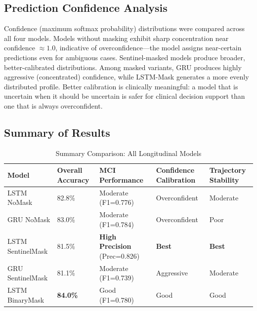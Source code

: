 \documentclass[12pt,singleside,a4paper]{article}
\begin{document}
\subsection{Prediction Confidence Analysis}

Confidence (maximum softmax probability) distributions were compared across all four models. Models without masking exhibit sharp concentration near confidence $\approx 1.0$, indicative of overconfidence—the model assigns near-certain predictions even for ambiguous cases. Sentinel-masked models produce broader, better-calibrated distributions. Among masked variants, GRU produces highly aggressive (concentrated) confidence, while LSTM-Mask generates a more evenly distributed profile. Better calibration is clinically meaningful: a model that is uncertain when it should be uncertain is safer for clinical decision support than one that is always overconfident.

\subsection{Summary of Results}

\begin{table}[h]
\centering
\caption{Summary Comparison: All Longitudinal Models}
\begin{tabular}{lp{2.2cm}p{2.2cm}p{2.2cm}p{2.2cm}}
\toprule
\textbf{Model} & \textbf{Overall Accuracy} & \textbf{MCI Performance} & \textbf{Confidence Calibration} & \textbf{Trajectory Stability} \\
\midrule
LSTM NoMask      & 82.8\% & Moderate (F1=0.776) & Overconfident & Moderate \\
GRU NoMask       & 83.0\% & Moderate (F1=0.784) & Overconfident & Poor \\
LSTM SentinelMask & 81.5\% & \textbf{High Precision} (Prec=0.826) & \textbf{Best} & \textbf{Best} \\
GRU SentinelMask  & 81.1\% & Moderate (F1=0.739) & Aggressive & Moderate \\
LSTM BinaryMask  & \textbf{84.0\%} & Good (F1=0.780) & Good & Good \\
\bottomrule
\end{tabular}
\label{tab:summary}
\end{table}
\end{document}
